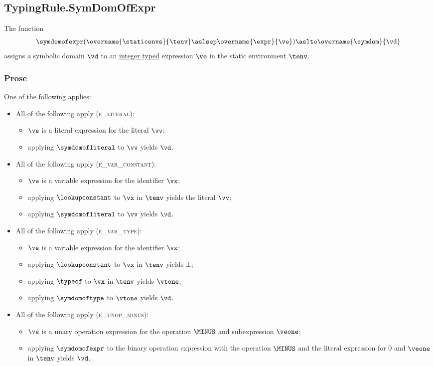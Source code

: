 \subsection{TypingRule.SymDomOfExpr \label{sec:TypingRule.SymDomOfExpr}}
\hypertarget{def-symdomofexpr}{}
The function
\[
\symdomofexpr(
  \overname{\staticenvs}{\tenv} \aslsep
  \overname{\expr}{\ve}
) \aslto
\overname{\symdom}{\vd}
\]
assigns a symbolic domain $\vd$ to an \underline{integer typed} expression $\ve$ in the static environment $\tenv$.

\subsubsection{Prose}
One of the following applies:
\begin{itemize}
  \item All of the following apply (\textsc{e\_literal}):
  \begin{itemize}
    \item $\ve$ is a literal expression for the literal $\vv$;
    \item applying $\symdomofliteral$ to $\vv$ yields $\vd$.
  \end{itemize}

  \item All of the following apply (\textsc{e\_var\_constant}):
  \begin{itemize}
    \item $\ve$ is a variable expression for the identifier $\vx$;
    \item applying $\lookupconstant$ to $\vx$ in $\tenv$ yields the literal $\vv$;
    \item applying $\symdomofliteral$ to $\vv$ yields $\vd$.
  \end{itemize}

  \item All of the following apply (\textsc{e\_var\_type}):
  \begin{itemize}
    \item $\ve$ is a variable expression for the identifier $\vx$;
    \item applying $\lookupconstant$ to $\vx$ in $\tenv$ yields $\bot$;
    \item applying $\typeof$ to $\vx$ in $\tenv$ yields $\vtone$;
    \item applying $\symdomoftype$ to $\vtone$ yields $\vd$.
  \end{itemize}

  \item All of the following apply (\textsc{e\_unop\_minus}):
  \begin{itemize}
    \item $\ve$ is a unary operation expression for the operation $\MINUS$ and subexpression $\veone$;
    \item applying $\symdomofexpr$ to the binary operation expression with the operation $\MINUS$
          and the literal expression for $0$ and $\veone$ in $\tenv$ yields $\vd$.
  \end{itemize}


\end{itemize}
